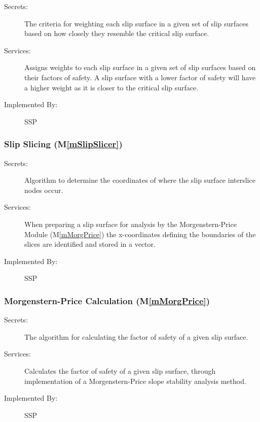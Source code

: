 \documentclass[12pt, titlepage]{article}
\newcommand{\progname}{SSP}
\newcommand{\mref}[1]{M\ref{#1}}
\begin{document}
\begin{description}
\item[Secrets:] The criteria for weighting each slip surface in a given set of 
slip surfaces based on how closely they resemble the critical slip surface.
\item[Services:] Assigns weights to each slip surface in a given set of slip 
surfaces based on their factors of safety. A slip surface with a lower factor 
of safety will have a higher weight as it is closer to the critical slip 
surface.
\item[Implemented By:] \progname
\end{description} 

\subsubsection{Slip Slicing (\mref{mSlipSlicer})}

\begin{description}
	\item[Secrets:] Algorithm to determine the coordinates of where the
	slip surface interslice nodes occur.
	\item[Services:] When preparing a slip surface for analysis by the
	Morgenstern-Price Module (\mref{mMorgPrice}) the x-coordinates defining the 
	boundaries of the slices are identified and stored in a vector.
	\item[Implemented By:] \progname
\end{description} 

\subsubsection{Morgenstern-Price Calculation (\mref{mMorgPrice})}

\begin{description}
\item[Secrets:] The algorithm for calculating the factor of safety of a given 
slip surface.
\item[Services:] Calculates the factor of safety of a given slip
  surface, through implementation of a Morgenstern-Price slope
  stability analysis method.
\item[Implemented By:] \progname
\end{description} 
\end{document}
